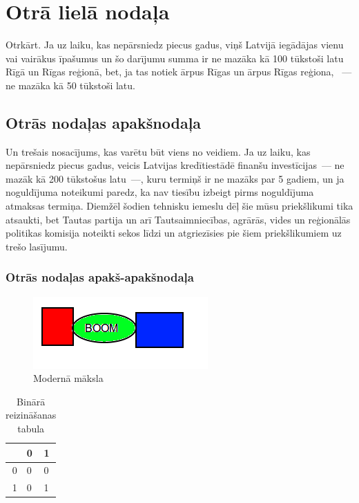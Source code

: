 \documentclass{LU-nosleguma}
\begin{document}
\section{Otrā lielā nodaļa}
Otrkārt. Ja uz laiku, kas nepārsniedz piecus gadus, viņš Latvijā iegādājas vienu vai vairākus īpašumus un šo darījumu
summa ir ne mazāka kā 100 tūkstoši latu Rīgā un Rīgas reģionā, bet, ja tas notiek ārpus Rīgas un ārpus Rīgas reģiona,
~--- ne mazāka kā 50 tūkstoši latu.

\subsection{Otrās nodaļas apakšnodaļa}
Un trešais nosacījums, kas varētu būt viens no veidiem. Ja uz laiku, kas nepārsniedz piecus gadus, veicis Latvijas 
kredītiestādē finanšu investīcijas~--- ne mazāk kā 200 tūkstošus latu~---, kuru termiņš ir ne mazāks par 5 gadiem, 
un ja noguldījuma noteikumi paredz, ka nav tiesību izbeigt pirms noguldījuma atmaksas termiņa.
Diemžēl šodien tehnisku iemeslu dēļ šie mūsu priekšlikumi tika atsaukti, bet Tautas partija un arī Tautsaimniecības, 
agrārās, vides un reģionālās politikas komisija noteikti sekos līdzi un atgriezīsies pie šiem priekšlikumiem uz trešo 
lasījumu.

\subsubsection{Otrās nodaļas apakš-apakšnodaļa}

\begin{figure}
	\centering
	\includegraphics{maksla.png}
	\caption{Modernā māksla}
\end{figure}

\begin{table}
	\caption{Binārā reizināšanas tabula}
	\centering
	\begin{tabular}{r | l | l |}
		  & 0 & 1\\ \hline
		0 & 0 & 0\\ \hline
		1 & 0 & 1\\ \hline
	\end{tabular}
\end{table}



\end{document}
